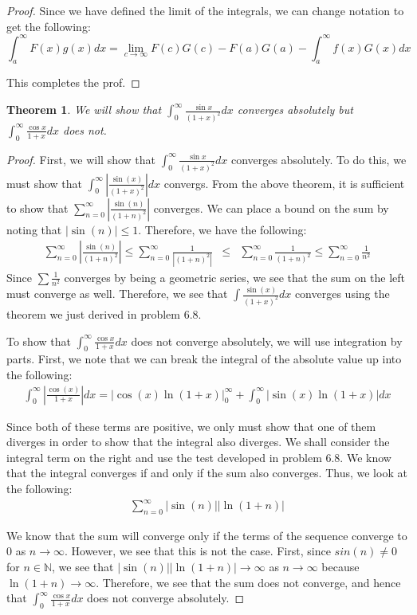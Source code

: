 \documentclass[psamsfonts]{amsart}
\newtheorem{thm}{Theorem}[section]
\theoremstyle{definition}
\theoremstyle{remark}
\numberwithin{equation}{section}
\begin{document}
\begin{proof}
Since we have defined the limit of the integrals, we can change notation to get the following:
\begin{equation}
\int_a^\infty F(x)g(x) dx = \lim_{c \to \infty} F(c)G(c) - F(a)G(a) - \int_a^\infty f(x)G(x) dx
\end{equation}

This completes the prof.
\end{proof}

\begin{thm}
We will show that $\int_0^\infty \frac{\sin x}{(1+x)^2} dx$ converges absolutely but $\int_0^\infty \frac{\cos x}{1 + x} dx$ does not.
\end{thm}

\begin{proof}
First, we will show that $\int_0^\infty \frac{\sin{x}}{(1+x)^2} dx$ converges absolutely. To do this, we must show that $\int_0^\infty \left| \frac{\sin(x)}{(1+x)^2} \right| dx$ convergs. From the above theorem, it is sufficient to show that $\sum_{n=0}^\infty |\frac{\sin(n)}{(1+n)^2}|$ converges. We can place a bound on the sum by noting that $|\sin(n)| \leq 1$. Therefore, we have the following:
\begin{eqnarray}
\sum_{n=0}^\infty \left| \frac{\sin(n)}{(1+n)^2} \right| \leq \sum_{n=0}^\infty \frac{1}{|(1+n)^2|} &\leq& \sum_{n=0}^\infty \frac{1}{(1+n)^2} \leq \sum_{n=0}^\infty \frac{1}{n^2}
\end{eqnarray}
Since $\sum \frac{1}{n^2}$ converges by being a geometric series, we see that the sum on the left must converge as well. Therefore, we see that $\int \frac{\sin(x)}{(1+x)^2} dx$ converges using the theorem we just derived in problem 6.8. 

To show that $\int_0^\infty \frac{\cos x}{1+x} dx$ does not converge absolutely, we will use integration by parts. First, we note that we can break the integral of the absolute value up into the following:
\begin{eqnarray}
\int_0^\infty \left| \frac{\cos (x)}{1+x} \right| dx = \left| \cos(x) \ln(1+x) \right|_0^\infty + \int_0^\infty |\sin(x) \ln (1+x) | dx
\end{eqnarray}

Since both of these terms are positive, we only must show that one of them diverges in order to show that the integral also diverges. We shall consider the integral term on the right and use the test developed in problem 6.8. We know that the integral converges if and only if the sum also converges. Thus, we look at the following:
\begin{eqnarray}
\sum_{n=0}^\infty |\sin(n)| |\ln(1+n)| 
\end{eqnarray}

We know that the sum will converge only if the terms of the sequence converge to $0$ as $n \to \infty$. However, we see that this is not the case. First, since $sin(n) \neq 0$ for $n \in \mathbb{N}$, we see that $|\sin(n)| |\ln(1+n)| \to \infty$ as $n \to \infty$ because $\ln(1+n) \to \infty$. Therefore, we see that the sum does not converge, and hence that $\int_0^\infty \frac{\cos x}{1+x} dx$ does not converge absolutely.  
\end{proof}
\end{document}
